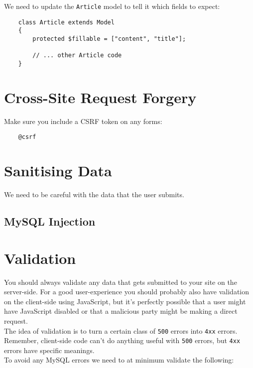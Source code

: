We need to update the \texttt{Article} model to tell it which fields to expect:

\begin{verbatim}
    class Article extends Model
    {
        protected $fillable = ["content", "title"];

        // ... other Article code
    }
\end{verbatim}

\section{Cross-Site Request Forgery}

Make sure you include a CSRF token on any forms:

\begin{verbatim}
    @csrf
\end{verbatim}

\section{Sanitising Data}

We need to be careful with the data that the user submits.

\subsection{MySQL Injection}


\section{Validation}
You should always validate any data that gets submitted to your site on the server-side. For a good user-experience you should probably also have validation on the client-side using JavaScript, but it's perfectly possible that a user might have JavaScript disabled or that a malicious party might be making a direct request.
\\

The idea of validation is to turn a certain class of \texttt{500} errors into \texttt{4xx} errors. Remember, client-side code can't do anything useful with \texttt{500} errors, but \texttt{4xx} errors have specific meanings.
\\

To avoid any MySQL errors we need to at minimum validate the following:

